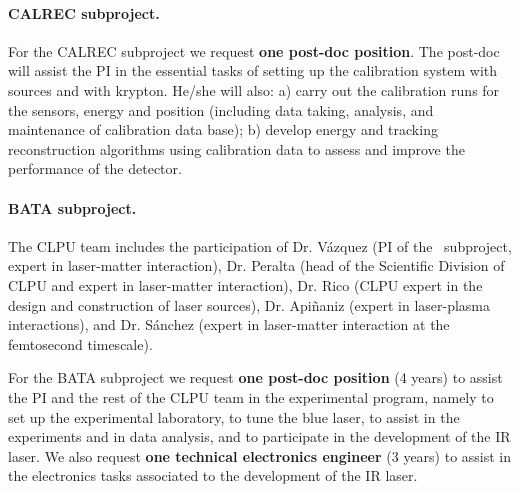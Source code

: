 \paragraph{CALREC subproject.}

For the CALREC subproject we request {\bf one post-doc position}. The post-doc will assist the PI in the essential tasks of setting up the calibration system with sources and with krypton. He/she will also: a) carry out the calibration runs for the sensors, energy and position (including data taking, analysis, and maintenance of calibration data base); b) develop energy and tracking reconstruction algorithms using calibration data to assess and improve the performance of the detector.

\paragraph{BATA subproject.}

The CLPU team includes the participation of Dr. V\'azquez (PI of the \BATA\ subproject, expert in laser-matter interaction), Dr. Peralta (head of the Scientific Division of CLPU and expert in laser-matter interaction), Dr. Rico (CLPU expert in the design and construction of laser sources), Dr. Api\~naniz (expert in laser-plasma interactions), and Dr. S\'anchez (expert in laser-matter interaction at the femtosecond timescale).

For the BATA subproject we request {\bf one post-doc position} (4 years) to assist the PI and the rest of the CLPU team in the experimental program, namely to set up the experimental laboratory, to tune the blue laser, to assist in the experiments and in data analysis, and to participate in the development of the IR laser. We also request {\bf one technical electronics engineer} (3 years) to assist in the electronics tasks associated to the development of the IR laser.  

